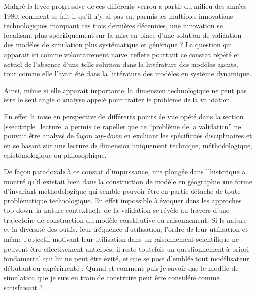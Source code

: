 Malgré la levée progressive de ces différents verrou à partir du milieu des années 1980, comment se fait il qu'il n'y ai pas eu, parmis les multiples innovations technologiques marquant ces trois dernières décennies, une innovation se focalisant plus spécifiquement sur la mise en place d'une solution de validation des modèles de simulation plus systématique et générique ? La question qui apparait ici comme volontairement naïve, reflete pourtant ce constat répété et actuel de l'absence d'une telle solution dans la littérature des modèles agents, tout comme elle l'avait été dans la littérature des modèles en système dynamique. 

Ainsi, même si elle apparait importante, la dimension technologique ne peut pas être le seul angle d'analyse appelé pour traiter le problème de la validation. 



En effet la mise en perspective de différents points de vue opéré dans la section \ref{ssec:triple_lecture} a permis de rapeller que ce \enquote{problème de la validation} ne pouvait être analysé de façon \textit{top-down} en excluant les spécificités disciplinaires et en se basant sur une lecture de dimension uniquement technique, méthodologique, epistémologique ou philosophique.


De façon paradoxale à ce constat d'impuissance, une plongée dans l'historique a montré qu'il existait bien dans la construction de modèle en géographie une forme d'invariant méthodologique qui semble pouvoir être en partie détaché de toute problématique technologique. En effet impossible à évoquer dans les approches top-down, la nature contextuelle de la validation se révèle au travers d'une trajectoire de construction du modèle constitutive du raisonnement. Si la nature et la diversité des outils, leur fréquence d'utilisation, l'ordre de leur utilisation et même l'objectif motivant leur utilisation dans un raisonnement scientifique ne peuvent être effectivement anticipés, il reste toutefois un questionnement à priori fondamental qui lui ne peut être évité, et que se pose d'emblée tout modélisateur débutant ou expérimenté : Quand et comment puis je savoir que le modèle de simulation que je suis en train de construire peut être considéré comme satisfaisant ?

